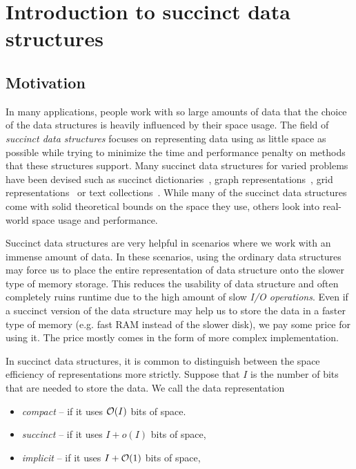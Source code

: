 \chapter{Introduction to succinct data structures}
\label{kap:kap1}


\section{Motivation}

In many applications, people work with so large amounts of data that the choice of
the data structures is heavily influenced by their space usage. The field
of \textit{succinct data structures} focuses on representing data using as little
space as possible while trying to minimize the time and performance penalty on methods
that these structures support. Many succinct data structures for varied problems
have been devised such as succinct dictionaries~\citep{raman2007succinct},
graph representations~\citep{farzan2013succinct}, grid representations~\citep{chazelle1988functional}
or text collections~\citep{ferragina2000opportunistic}. While many of the succinct
data structures come with solid theoretical bounds on the space they use, others look
into real-world space usage and performance.

Succinct data structures are very helpful in scenarios where we work with an immense amount
of data. In these scenarios, using the ordinary data structures may force us to place
the entire representation of data structure onto the slower type of memory storage. This
reduces the usability of data structure and often completely ruins runtime due to the
high amount of slow \textit{I/O operations}. Even if a succinct version of the data structure
may help us to store the data in a faster type of memory (e.g. fast RAM instead of the slower disk),
we pay some price for using it. The price mostly comes in the form of more complex implementation.

In succinct data structures, it is common to distinguish between the space efficiency of
representations more strictly. Suppose that $I$ is the number of bits that are needed to
store the data. We call the data representation
\begin{itemize}
	\item \textit{compact} -- if it uses $\mathcal{O}(I)$ bits of space.
	\item \textit{succinct} -- if it uses $I + o(I)$ bits of space,
	\item \textit{implicit} -- if it uses $I + \mathcal{O}(1)$ bits of space,
\end{itemize}

